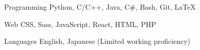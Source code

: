 

\begin{cvskills}

  \cvskill
    {Programming} %
    {Python, C/C++, Java, C\#, Bash, Git, LaTeX} %

  \cvskill
    {Web} %
    {CSS, Sass, JavaScript, React, HTML, PHP} %

  \cvskill
    {Languages} %
    {English, Japanese (Limited working proficiency)} %

\end{cvskills}
